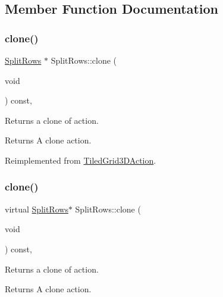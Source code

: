 \subsection{Member Function Documentation}
\mbox{\label{classSplitRows_ad03535f13689bc0d79030170ce12f5ba}} 
\subsubsection{\texorpdfstring{clone()}{clone()}\hspace{0.1cm}{\footnotesize\ttfamily [1/2]}}
{\footnotesize\ttfamily \hyperlink{classSplitRows}{Split\+Rows} $\ast$ Split\+Rows\+::clone (\begin{DoxyParamCaption}\item[{void}]{ }\end{DoxyParamCaption}) const\hspace{0.3cm}{\ttfamily [override]}, {\ttfamily [virtual]}}

Returns a clone of action.

\begin{DoxyReturn}{Returns}
A clone action. 
\end{DoxyReturn}


Reimplemented from \hyperlink{classTiledGrid3DAction_a689fd377cc0abae91db7def106529b53}{Tiled\+Grid3\+D\+Action}.

\mbox{\label{classSplitRows_a48c66e4c45079a55377b9dfa5a018930}} 
\subsubsection{\texorpdfstring{clone()}{clone()}\hspace{0.1cm}{\footnotesize\ttfamily [2/2]}}
{\footnotesize\ttfamily virtual \hyperlink{classSplitRows}{Split\+Rows}$\ast$ Split\+Rows\+::clone (\begin{DoxyParamCaption}\item[{void}]{ }\end{DoxyParamCaption}) const\hspace{0.3cm}{\ttfamily [override]}, {\ttfamily [virtual]}}

Returns a clone of action.

\begin{DoxyReturn}{Returns}
A clone action. 
\end{DoxyReturn}


